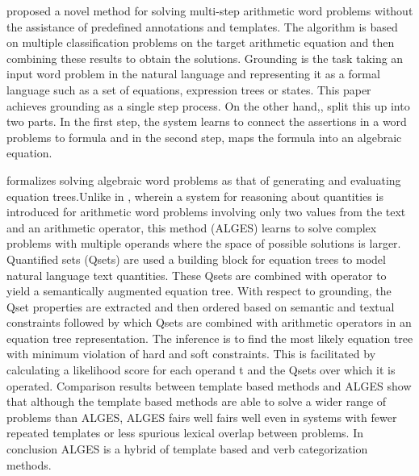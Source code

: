 \documentclass[11pt,letterpaper]{article}
\begin{document}
\cite{roy2016solving} proposed a novel method for solving multi-step arithmetic word problems without the assistance of predefined annotations and templates. The algorithm is based on multiple classification problems on the target arithmetic equation and then combining these results to obtain the solutions. Grounding is the task taking an input word problem in the natural language and representing it as a formal language such as a set of equations, expression trees or states. This paper achieves grounding as a single step process. On the other hand,\citep{mitra2016learning}, split this up into two parts. In the first step, the system learns to connect the assertions in a word problems to formula and in the second step, maps the formula into an algebraic equation.

\cite{KoncelKedziorski2015ParsingAW} formalizes solving algebraic word problems as that of generating and evaluating equation trees.Unlike in \cite{roy2017reasoning}, wherein a system for reasoning about quantities is introduced for arithmetic word problems involving only two values from the text and an arithmetic operator, this method (ALGES) learns to solve complex problems with multiple operands where the space of possible solutions is larger. Quantified sets (Qsets) are used a building block for equation trees to model natural language text quantities. These Qsets are combined with operator to yield a semantically augmented equation tree. With respect to grounding, the Qset properties are extracted and then ordered based on semantic and textual constraints followed by which Qsets are combined with arithmetic operators in an equation tree representation. The inference is to find the most likely equation tree with minimum violation of hard and soft constraints. This is facilitated by calculating a likelihood score for each operand t and the Qsets over which it is operated. Comparison results between template based methods and ALGES show
that although the template based methods are able to solve a wider range of problems than ALGES, ALGES fairs well fairs well even in systems with fewer repeated templates or less spurious lexical overlap between problems. In conclusion ALGES is a hybrid of template based and verb categorization methods.
\end{document}
